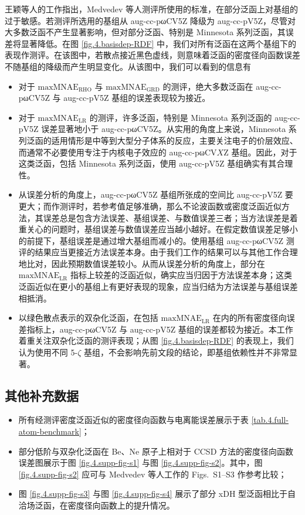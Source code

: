王颖等人\cite{Wang-He.JCTC.2017}的工作指出，Medvedev 等人\cite{Medvedev-Lyssenko.S.2017}测评所使用的标准，在部分泛函上对基组的过于敏感。若测评所选用的基组从 aug-cc-pωCV5Z 降级为 aug-cc-pV5Z，尽管对大多数泛函不产生显著影响，但对部分泛函、特别是 Minnesota 系列泛函，其误差将显著降低。在图 \ref{fig.4.basisdep-RDF} 中，我们对所有泛函在这两个基组下的表现作测评。在该图中，若散点接近黑色虚线，则意味着泛函的密度径向函数误差不随基组的降级而产生明显变化。从该图中，我们可以看到的信息有
\begin{itemize}[nosep]
    \item 对于 $\text{maxMNAE}_\text{RHO}$ 与 $\text{maxMNAE}_\text{GRD}$ 的测评，绝大多数泛函在 aug-cc-pωCV5Z 与 aug-cc-pV5Z 基组的误差表现较为接近。
    \item 对于 $\text{maxMNAE}_\text{LR}$ 的测评，许多泛函，特别是 Minnesota 系列泛函的 aug-cc-pV5Z 误差显著地小于 aug-cc-pωCV5Z。从实用的角度上来说，Minnesota 系列泛函的适用情形是中等到大型分子体系的反应，主要关注电子的价层效应、而通常不必要使用专注于内核电子效应的 aug-cc-pωCV$X$Z 基组。因此，对于这类泛函，包括 Minnesota 系列泛函，使用 aug-cc-pV5Z 基组确实有其合理性。
    \item 从误差分析的角度上，aug-cc-pωCV5Z 基组所张成的空间比 aug-cc-pV5Z 要更大；而作测评时，若参考值足够准确，那么不论波函数或密度泛函近似方法，其误差总是包含方法误差、基组误差、与数值误差三者；当方法误差是着重关心的问题时，基组误差与数值误差应当越小越好。在假定数值误差足够小的前提下，基组误差是通过增大基组而减小的。使用基组 aug-cc-pωCV5Z 测评的结果应当更接近方法误差本身。由于我们工作的结果可以与其他工作合理地比对\cite{Medvedev-Lyssenko.S.2017, Kepp-Kepp.S.2017, Wang-He.JCTC.2017}，因此预期数值误差较小。从而从误差分析的角度上，部分在 $\text{maxMNAE}_\text{LR}$ 指标上较差的泛函近似，确实应当归因于方法误差本身；这类泛函近似在更小的基组上有更好表现的现象，应当归结为方法误差与基组误差相抵消。
    \item 以绿色散点表示的双杂化泛函，在包括 $\text{maxMNAE}_\text{LR}$ 在内的所有密度径向误差指标上，aug-cc-pωCV5Z 与 aug-cc-pV5Z 基组的误差都较为接近。本工作着重关注双杂化泛函的测评表现；从图 \ref{fig.4.basisdep-RDF} 的表现上，我们认为使用不同 5-$\zeta$ 基组，不会影响先前文段的结论，即基组依赖性并不非常显著。
\end{itemize}

\subsection{其他补充数据}

\begin{itemize}[nosep]
    \item 所有经测评密度泛函近似的密度径向函数与电离能误差展示于表 \ref{tab.4.full-atom-benchmark}；
    \item 部分低阶与双杂化泛函在 Be、Ne 原子上相对于 CCSD 方法的密度径向函数误差图展示于图 \ref{fig.4.supp-fig-s1} 与图 \ref{fig.4.supp-fig-s2}。其中，图 \ref{fig.4.supp-fig-s2} 应可与 Medvedev 等人\cite{Medvedev-Lyssenko.S.2017}工作的 Figs.\ S1--S3 作参考比较；
    \item 图 \ref{fig.4.supp-fig-s3} 与图 \ref{fig.4.supp-fig-s4} 展示了部分 xDH 型泛函相比于自洽场泛函，在密度径向函数上的提升情况。
\end{itemize}


